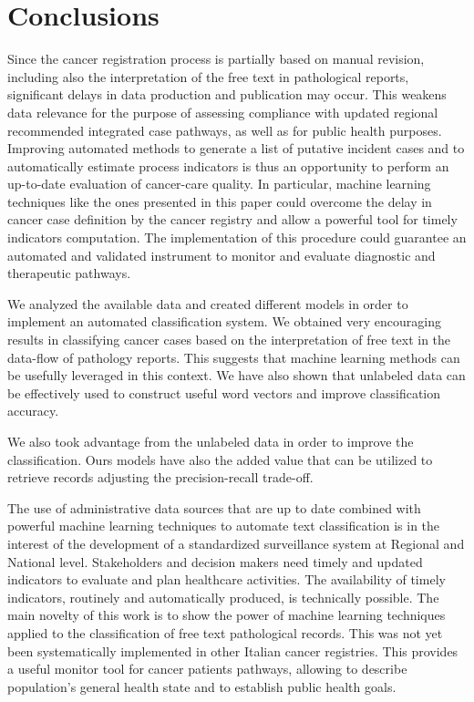 \chapter{Conclusions}
Since the cancer registration process is partially based on manual
revision, including also the interpretation of the free text in
pathological reports, significant delays in data production and
publication may occur. This weakens data relevance for the purpose of
assessing compliance with updated regional recommended integrated case
pathways, as well as for public health purposes. Improving automated
methods to generate a list of putative incident cases and to
automatically estimate process indicators is thus an opportunity to
perform an up-to-date evaluation of cancer-care quality. In
particular, machine learning techniques like the ones presented in
this paper could overcome the delay in cancer case definition by the
cancer registry and allow a powerful tool for timely indicators
computation. The implementation of this procedure could guarantee an
automated and validated instrument to monitor and evaluate diagnostic
and therapeutic pathways.

We analyzed the available data and created different models in order
to implement an automated classification system. We obtained very
encouraging results in classifying cancer cases based on the
interpretation of free text in the data-flow of pathology
reports. This suggests that machine learning methods can be usefully
leveraged in this context.  We have also shown that unlabeled data can
be effectively used to construct useful word vectors and improve
classification accuracy. 

We also took advantage from the unlabeled data in order to improve
the classification. Ours models have also the added value that can be
utilized to retrieve records adjusting the precision-recall trade-off.

The use of administrative data sources that are up to date combined
with powerful machine learning techniques to automate text
classification is in the interest of the development of a standardized
surveillance system at Regional and National level. Stakeholders and
decision makers need timely and updated indicators to evaluate and
plan healthcare activities. The availability of timely indicators,
routinely and automatically produced, is technically possible. The
main novelty of this work is to show the power of machine learning
techniques applied to the classification of free text pathological
records. This was not yet been systematically implemented in other
Italian cancer registries. This provides a useful monitor tool for
cancer patients pathways, allowing to describe population’s general
health state and to establish public health goals.

